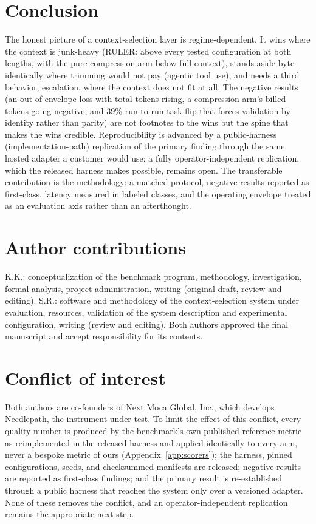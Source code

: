 \documentclass[11pt]{article}
\newcommand{\NP}{Needlepath}
\begin{document}
\section{Conclusion}
\label{sec:conclusion}

The honest picture of a context-selection layer is regime-dependent. It wins where the context is
junk-heavy (RULER: above every tested configuration at both lengths, with the pure-compression arm
below full context), stands aside byte-identically where trimming would not pay (agentic tool use),
and needs a third behavior, escalation, where the context does not fit at all. The negative results
(an out-of-envelope loss with total tokens rising, a compression arm's billed tokens going negative,
and $39\%$ run-to-run task-flip that forces validation by identity rather than parity) are not
footnotes to the wins but the spine that makes the wins credible. Reproducibility is
advanced by a public-harness (implementation-path) replication of the primary finding through the
same hosted adapter a customer would use; a fully operator-independent replication, which the
released harness makes possible, remains open. The transferable contribution is the methodology: a
matched protocol, negative
results reported as first-class, latency measured in labeled classes, and the operating envelope
treated as an evaluation axis rather than an afterthought.

\section*{Author contributions}
K.K.: conceptualization of the benchmark program, methodology, investigation, formal analysis,
project administration, writing (original draft, review and editing). S.R.: software and methodology
of the context-selection system under evaluation, resources, validation of the system description
and experimental configuration, writing (review and editing). Both authors approved the final
manuscript and accept responsibility for its contents.

\section*{Conflict of interest}
Both authors are co-founders of Next Moca Global, Inc., which develops \NP{}, the instrument under test. To limit
the effect of this conflict, every quality number is produced by the benchmark's own published
reference metric as reimplemented in the released harness and applied identically to every arm,
never a bespoke metric of ours (Appendix~\ref{app:scorers}); the harness, pinned configurations, seeds, and checksummed manifests are released; negative
results are reported as first-class findings; and the primary result is re-established through a
public harness that reaches the system only over a versioned adapter. None of these removes the
conflict, and an operator-independent replication remains the appropriate next step.
\end{document}
